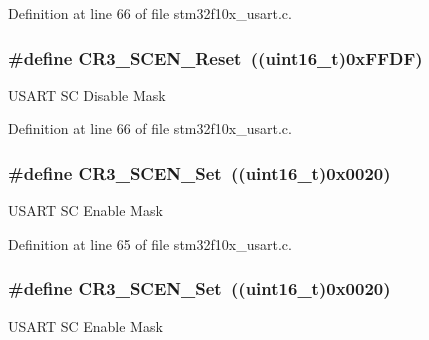 Definition at line 66 of file stm32f10x\+\_\+usart.\+c.

\subsubsection[{\texorpdfstring{C\+R3\+\_\+\+S\+C\+E\+N\+\_\+\+Reset}{CR3_SCEN_Reset}}]{\setlength{\rightskip}{0pt plus 5cm}\#define C\+R3\+\_\+\+S\+C\+E\+N\+\_\+\+Reset~(({\bf uint16\+\_\+t})0x\+F\+F\+D\+F)}\hypertarget{group___u_s_a_r_t___private___defines_ga294c473dc7f8ff3e9cbaa0675c8c75f3}{}\label{group___u_s_a_r_t___private___defines_ga294c473dc7f8ff3e9cbaa0675c8c75f3}
U\+S\+A\+RT SC Disable Mask 

Definition at line 66 of file stm32f10x\+\_\+usart.\+c.

\subsubsection[{\texorpdfstring{C\+R3\+\_\+\+S\+C\+E\+N\+\_\+\+Set}{CR3_SCEN_Set}}]{\setlength{\rightskip}{0pt plus 5cm}\#define C\+R3\+\_\+\+S\+C\+E\+N\+\_\+\+Set~(({\bf uint16\+\_\+t})0x0020)}\hypertarget{group___u_s_a_r_t___private___defines_gab47df7b36b4f1315953f6aa45de2fb61}{}\label{group___u_s_a_r_t___private___defines_gab47df7b36b4f1315953f6aa45de2fb61}
U\+S\+A\+RT SC Enable Mask 

Definition at line 65 of file stm32f10x\+\_\+usart.\+c.

\subsubsection[{\texorpdfstring{C\+R3\+\_\+\+S\+C\+E\+N\+\_\+\+Set}{CR3_SCEN_Set}}]{\setlength{\rightskip}{0pt plus 5cm}\#define C\+R3\+\_\+\+S\+C\+E\+N\+\_\+\+Set~(({\bf uint16\+\_\+t})0x0020)}\hypertarget{group___u_s_a_r_t___private___defines_gab47df7b36b4f1315953f6aa45de2fb61}{}\label{group___u_s_a_r_t___private___defines_gab47df7b36b4f1315953f6aa45de2fb61}
U\+S\+A\+RT SC Enable Mask 

